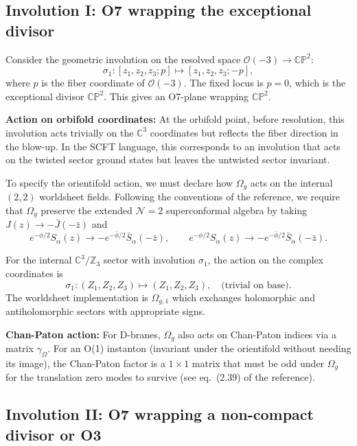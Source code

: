 \documentclass[11pt]{article}
\newcommand{\Z}{\mathbb{Z}}
\newcommand{\C}{\mathbb{C}}
\newcommand{\CP}{\mathbb{CP}}
\newcommand{\cO}{\mathcal{O}}
\newcommand{\oo}{\Omega_g}
\newcommand{\NN}{\mathcal{N}}
\begin{document}
\subsection{Involution I: O7 wrapping the exceptional divisor}

Consider the geometric involution on the resolved space $\cO(-3) \to \CP^2$:
\begin{equation}\label{eq:inv1}
\sigma_1: [z_1, z_2, z_3; p] \mapsto [z_1, z_2, z_3; -p],
\end{equation}
where $p$ is the fiber coordinate of $\cO(-3)$. The fixed locus is $p = 0$, which is the exceptional divisor $\CP^2$. This gives an O7-plane wrapping $\CP^2$.

\textbf{Action on orbifold coordinates:} At the orbifold point, before resolution, this involution acts trivially on the $\C^3$ coordinates but reflects the fiber direction in the blow-up. In the SCFT language, this corresponds to an involution that acts on the twisted sector ground states but leaves the untwisted sector invariant.

To specify the orientifold action, we must declare how $\oo$ acts on the internal $(2,2)$ worldsheet fields. Following the conventions of the reference, we require that $\oo$ preserve the extended $\NN=2$ superconformal algebra by taking $J(z) \to -\bar{J}(-\bar{z})$ and
\begin{equation}
e^{-\phi/2} S_\alpha(z) \to -e^{-\bar{\phi}/2} \bar{S}_\alpha(-\bar{z}), \qquad e^{-\phi/2} S_{\dot{\alpha}}(z) \to -e^{-\bar{\phi}/2} \bar{S}_{\dot{\alpha}}(-\bar{z}).
\end{equation}

For the internal $\C^3/\Z_3$ sector with involution $\sigma_1$, the action on the complex coordinates is
\begin{equation}
\sigma_1: (Z_1, Z_2, Z_3) \mapsto (Z_1, Z_2, Z_3), \quad \text{(trivial on base)}.
\end{equation}
The worldsheet implementation is $\Omega_{g,1}$ which exchanges holomorphic and antiholomorphic sectors with appropriate signs.

\textbf{Chan-Paton action:} For D-branes, $\oo$ also acts on Chan-Paton indices via a matrix $\gamma_{\Omega}$. For an O(1) instanton (invariant under the orientifold without needing its image), the Chan-Paton factor is a $1 \times 1$ matrix that must be odd under $\oo$ for the translation zero modes to survive (see eq.~(2.39) of the reference).

\subsection{Involution II: O7 wrapping a non-compact divisor or O3}
\end{document}
